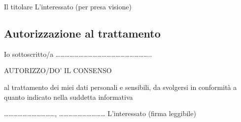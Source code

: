 Il titolare \flushright L’interessato (per presa visione)

\subsection*{Autorizzazione al trattamento}
Io sottoscritto/a ……………………………………………………..
\begin{center}
AUTORIZZO/DO’ IL CONSENSO
\end{center}
\begin{emptysquares}
    \item al trattamento dei miei dati personali e sensibili, da svolgersi in conformità a quanto indicato nella suddetta informativa
\end{emptysquares}

……………………………, …………………………
 L’interessato (firma leggibile)
